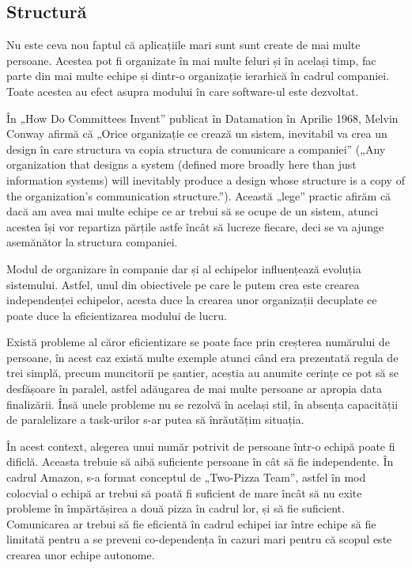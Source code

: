 \subsection{Structură}

Nu este ceva nou faptul că aplicațiile mari sunt sunt create de mai multe persoane. Acestea pot fi
organizate în mai multe feluri și în același timp, fac parte din mai multe echipe și dintr-o
organizație ierarhică în cadrul companiei. Toate acestea au efect asupra modului în care
software-ul este dezvoltat.

În „How Do Committees Invent” publicat în Datamation în Aprilie 1968, Melvin Conway afirmă
că „Orice organizație ce crează un sistem, inevitabil va crea un design în care structura
va copia structura de comunicare a companiei” („Any organization that designs a system (defined more broadly here than
just information systems) will inevitably produce a design whose structure is a copy of the organization's
communication structure.”). Această „lege” practic afirăm că dacă am avea mai multe echipe ce ar
trebui să se ocupe de un sistem, atunci acestea își vor repartiza părțile astfe încât să lucreze fiecare,
deci se va ajunge asemănător la structura companiei.

Modul de organizare în companie dar și al echipelor influențează evoluția sistemului. Astfel,
unul din obiectivele pe care le putem crea este crearea independenței echipelor, acesta duce
la crearea unor organizații decuplate ce poate duce la eficientizarea modului de lucru.

Există probleme al căror eficientizare se poate face prin creșterea numărului de persoane,
în acest caz există multe exemple atunci când era prezentată regula de trei simplă, precum 
muncitorii pe șantier, aceștia au anumite cerințe ce pot să se desfășoare în paralel, astfel
adăugarea de mai multe persoane ar apropia data finalizării. Însă unele probleme nu se 
rezolvă în același stil, în absența capacității de paralelizare a task-urilor s-ar putea să 
înrăutățim situația. 

În acest context, alegerea unui număr potrivit de persoane într-o echipă poate fi dificlă.
Aceasta trebuie să aibă suficiente persoane în cât să fie independente. În cadrul Amazon,
s-a format conceptul de „Two-Pizza Team”, astfel în mod colocvial o echipă ar trebui să poată
fi suficient de mare încât să nu exite probleme în împărtășirea a două pizza în cadrul lor, 
și să fie suficient. Comunicarea ar trebui să fie eficientă în cadrul echipei iar între echipe
să fie limitată pentru a se preveni co-dependența în cazuri mari pentru că scopul 
este crearea unor echipe autonome.

